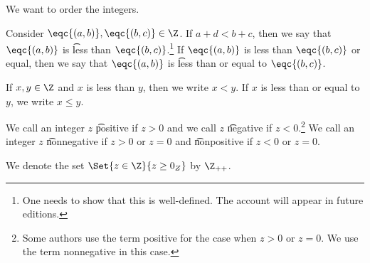 

We want to order the integers.


Consider $\eqc{(a, b)}, \eqc{(b, c)} \in \Z$.
If $a + d < b + c$, then we say that
$\eqc{(a, b)}$ is \t{less than} $\eqc{(b, c)}$.\footnote{One needs to show that this is well-defined. The account will appear in future editions.}
If $\eqc{(a, b)}$ is less than $\eqc{(b, c)}$ or equal, then we say that $\eqc{(a, b)}$ is \t{less than or equal to} $\eqc{(b, c)}$.


If $x, y \in \Z$ and $x$ is less than $y$, then we write $x < y$.
If $x$ is less than or equal to $y$, we write $x \leq y$.


We call an integer $z$ \t{positive} if $z > 0$ and we call $z$  \t{negative} if $z < 0$.\footnote{Some authors use the term positive for the case when $z > 0$ or $z = 0$. We use the term nonnegative in this case.}
We call an integer $z$ \t{nonnegative} if $z > 0$ or $z = 0$ and \t{nonpositive} if $z < 0$ or $z = 0$.


We denote the set $\Set{z \in \Z}{z \geq 0_{Z}}$ by $\Z_{++}$.

\blankpage
